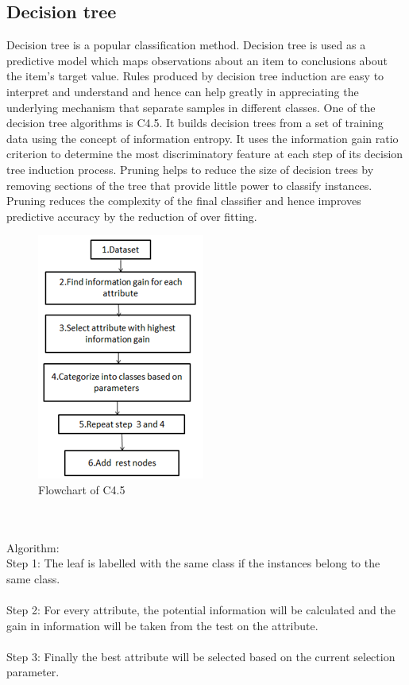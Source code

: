 \documentclass[conference]{IEEEtran}
\begin{document}
\subsection{Decision tree}
Decision tree is a popular classification method. Decision tree is used as a predictive model which maps observations about an item to conclusions about the item's target value. Rules produced by decision tree induction are easy to interpret and understand and hence can help greatly in appreciating the underlying mechanism that separate samples in different classes. One of the decision tree algorithms is C4.5. It builds decision trees from a set of training data using the concept of information entropy. It uses the information gain ratio criterion to determine the most discriminatory feature at each step of its  decision tree induction process. Pruning helps to reduce the size of decision trees by removing sections of the tree that provide little power to classify instances. Pruning reduces the complexity of the final classifier and hence improves predictive accuracy by the reduction of over fitting.
\begin{figure}[!h]
\centering
\includegraphics[scale=0.9]{flowchartC45}
\caption{Flowchart of C4.5}
\label{fig_sin}
\end{figure}
\\ \\
Algorithm:
\\Step 1: The leaf is labelled with the same class if the instances belong to the same class. \\
\\Step 2: For every attribute, the potential information will be calculated and the gain in information will be taken from the test on the attribute. \\
\\Step 3: Finally the best attribute will be selected based on the current selection parameter. \\
\end{document}
